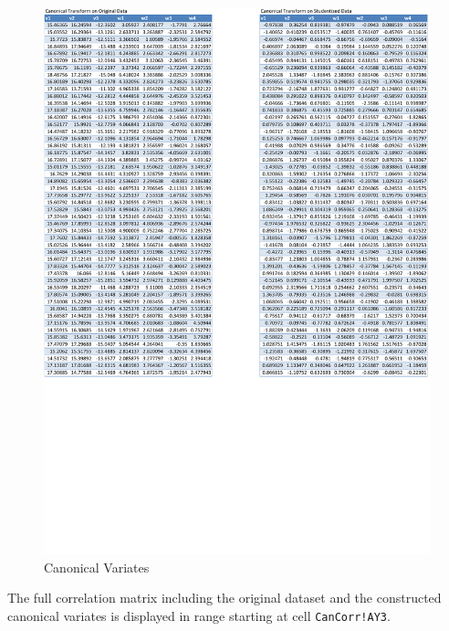 \documentclass[article]{jss}
\begin{document}
        \begin{figure}[!tbh]
          \includegraphics[width=\linewidth, keepaspectratio=true]{img/CanCorrSheetCanCorrVariates}
          \vspace{-20pt}\centering{}\protect\caption{Canonical Variates}\label{fig:CanCorrSheetCanCorrVariates}
        \end{figure}
        The full correlation matrix including the original dataset and the constructed canonical variates is displayed in range starting at cell \texttt{CanCorr!AY3}.
\end{document}
